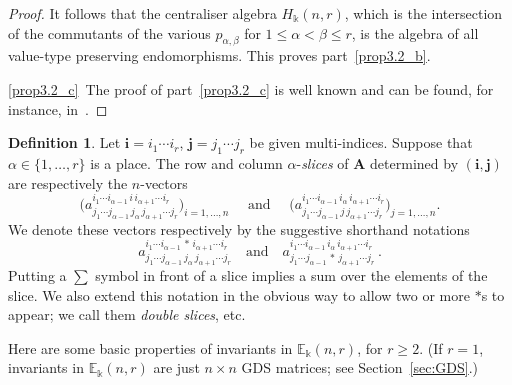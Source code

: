 \documentclass[10pt]{article}
\theoremstyle{definition}
\newtheorem{defi}[theorem]{Definition}
\providecommand{\etc}{etc.\ }
\newcommand{\E}{\mathbb{E}}
\newcommand{\bi}{{\boldsymbol{i}}} %
\newcommand{\bj}{{\boldsymbol{j}}}
\newcommand{\qand}{\quad\text{and}\quad}
\newcommand{\bA}{\mathbf{A}}
\begin{document}
\begin{proof}
It follows that the centraliser algebra $H_\Bbbk(n,r)$, which is the
intersection of the commutants of the various $p_{\alpha,\beta}$ for
$1 \le \alpha < \beta \le r$, is the algebra of all value-type
preserving endomorphisms. This proves part~\ref{prop3.2_b}.

\ref{prop3.2_c}~The proof of part~\ref{prop3.2_c} is well known and can be found, for instance, in~\cite{Green:book}.
\end{proof}




\begin{defi}\label{def:slices}
Let $\bi = i_1 \cdots i_r$, $\bj = j_1 \cdots j_r$ be given
multi-indices. Suppose that $\alpha \in \{1, \dots, r\}$ is a
place. The row and column $\alpha$-\emph{slices} of $\bA$ determined
by $(\bi,\bj)$ are respectively the $n$-vectors
 \[
 \big( a^{i_1\cdots i_{\alpha-1} \,i\, i_{\alpha+1}\cdots
 i_r}_{j_1\cdots j_{\alpha-1} \, j_\alpha\, j_{\alpha+1}\cdots
 j_r}\big)_{i = 1, \dots, n} \quad \text{ and } \quad \big(
 a^{i_1\cdots i_{\alpha-1} \,i_\alpha\, i_{\alpha+1}\cdots
 i_r}_{j_1\cdots j_{\alpha-1} \,j\, j_{\alpha+1}\cdots j_r}
 \big)_{j = 1, \dots, n} .
 \]
We denote these vectors respectively by the suggestive shorthand
notations
 \[
 a^{i_1\cdots i_{\alpha-1} \,*\, i_{\alpha+1}\cdots i_r}_{j_1\cdots
 j_{\alpha-1} \, j_\alpha\, j_{\alpha+1}\cdots j_r} \qand a^{i_1\cdots
 i_{\alpha-1} \,i_\alpha\, i_{\alpha+1}\cdots i_r}_{j_1\cdots
 j_{\alpha-1} \,*\, j_{\alpha+1}\cdots j_r} \, .
 \]
Putting a $\sum$ symbol in front of a slice implies a sum over
the elements of the slice. We also extend this notation in the
obvious way to allow two or more $*$s to appear; we call them
\emph{double slices}, \etc
\end{defi}

Here are some basic properties of invariants in $\E_\Bbbk(n,r)$, for
$r \ge 2$. (If $r=1$, invariants in $\E_\Bbbk(n,r)$ are just $n
\times n$ GDS matrices; see Section~\ref{sec:GDS}.)
\end{document}
